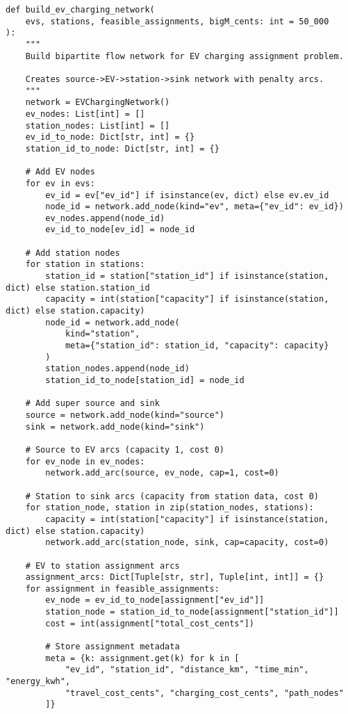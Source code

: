 \documentclass[12pt,a4paper]{article}
\begin{document}
\begin{lstlisting}[caption=Bipartite Network Construction]
def build_ev_charging_network(
    evs, stations, feasible_assignments, bigM_cents: int = 50_000
):
    """
    Build bipartite flow network for EV charging assignment problem.
    
    Creates source->EV->station->sink network with penalty arcs.
    """
    network = EVChargingNetwork()
    ev_nodes: List[int] = []
    station_nodes: List[int] = []
    ev_id_to_node: Dict[str, int] = {}
    station_id_to_node: Dict[str, int] = {}
    
    # Add EV nodes
    for ev in evs:
        ev_id = ev["ev_id"] if isinstance(ev, dict) else ev.ev_id
        node_id = network.add_node(kind="ev", meta={"ev_id": ev_id})
        ev_nodes.append(node_id)
        ev_id_to_node[ev_id] = node_id
    
    # Add station nodes  
    for station in stations:
        station_id = station["station_id"] if isinstance(station, dict) else station.station_id
        capacity = int(station["capacity"] if isinstance(station, dict) else station.capacity)
        node_id = network.add_node(
            kind="station", 
            meta={"station_id": station_id, "capacity": capacity}
        )
        station_nodes.append(node_id)
        station_id_to_node[station_id] = node_id
    
    # Add super source and sink
    source = network.add_node(kind="source")
    sink = network.add_node(kind="sink")
    
    # Source to EV arcs (capacity 1, cost 0)
    for ev_node in ev_nodes:
        network.add_arc(source, ev_node, cap=1, cost=0)
    
    # Station to sink arcs (capacity from station data, cost 0)
    for station_node, station in zip(station_nodes, stations):
        capacity = int(station["capacity"] if isinstance(station, dict) else station.capacity)
        network.add_arc(station_node, sink, cap=capacity, cost=0)
    
    # EV to station assignment arcs
    assignment_arcs: Dict[Tuple[str, str], Tuple[int, int]] = {}
    for assignment in feasible_assignments:
        ev_node = ev_id_to_node[assignment["ev_id"]]
        station_node = station_id_to_node[assignment["station_id"]]
        cost = int(assignment["total_cost_cents"])
        
        # Store assignment metadata
        meta = {k: assignment.get(k) for k in [
            "ev_id", "station_id", "distance_km", "time_min", "energy_kwh",
            "travel_cost_cents", "charging_cost_cents", "path_nodes"
        ]}
        

\end{lstlisting}
\end{document}
